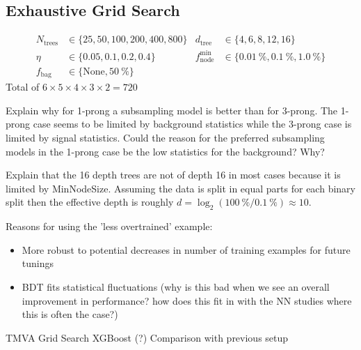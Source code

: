 
\subsection{Exhaustive Grid Search}
\label{sec:bdt_grid_search}

\begin{align*}
  N_\mathrm{trees} &\in \{25, 50, 100, 200, 400, 800\} &
  d_\mathrm{tree} &\in \{4, 6, 8, 12, 16\} \\
  \eta &\in \{0.05, 0.1, 0.2, 0.4\} &
  f_\mathrm{node}^\mathrm{min} &\in \{\SI{0.01}{\percent}, \SI{0.1}{\percent},\SI{1.0}{\percent}\} \\
  f_\text{bag} &\in \{\text{None}, \SI{50}{\percent} \}
\end{align*}
Total of $6 \times 5 \times 4 \times 3 \times 2 = 720$

Explain why for 1-prong a subsampling model is better than for 3-prong. The
1-prong case seems to be limited by background statistics while the 3-prong case
is limited by signal statistics. Could the reason for the preferred subsampling
models in the 1-prong case be the low statistics for the background? Why?

Explain that the 16 depth trees are not of depth 16 in most cases because it is
limited by MinNodeSize. Assuming the data is split in equal parts for each
binary split then the effective depth is roughly
$d = \log_2(\SI{100}{\percent} / \SI{0.1}{\percent}) \approx 10$.

Reasons for using the 'less overtrained' example:
\begin{itemize}
\item More robust to potential decreases in number of training examples for
  future tunings
\item BDT fits statistical fluctuations (why is this bad when we see an overall
  improvement in performance? how does this fit in with the NN studies where
  this is often the case?)
\end{itemize}

TMVA Grid Search
XGBoost (?)
Comparison with previous setup

